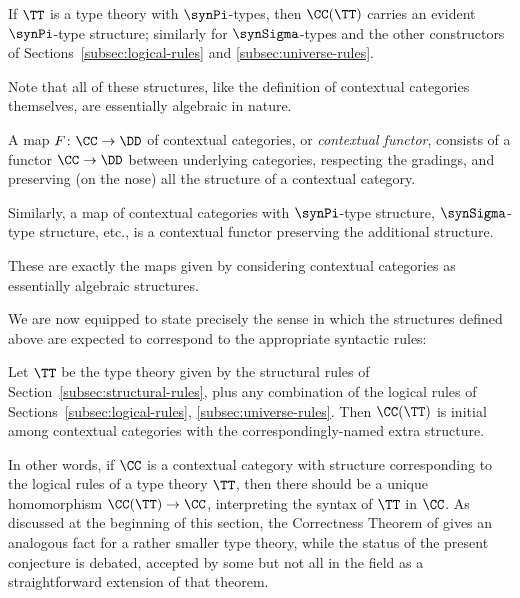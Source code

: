 \begin{example} If $\TT$ is a type theory with $\synPi$-types, then $\CC(\TT)$ carries an evident $\synPi$-type structure; similarly for $\synSigma$-types and the other constructors of Sections~\ref{subsec:logical-rules} and \ref{subsec:universe-rules}. \qedhere
\end{example}

\begin{remark}
Note that all of these structures, like the definition of contextual categories themselves, are essentially algebraic in nature.
\end{remark}

\begin{definition}
A map $F \colon \CC \to \DD$  of contextual categories, or \emph{contextual functor}, consists of a functor $\CC \to \DD$ between underlying categories, respecting the gradings, and preserving (on the nose) all the structure of a contextual category.

Similarly, a map of contextual categories with $\synPi$-type structure, $\synSigma$-type structure, etc., is a contextual functor preserving the additional structure.
\end{definition}

\begin{remark}
These are exactly the maps given by considering contextual categories as essentially algebraic structures.
\end{remark}

We are now equipped to state precisely the sense in which the structures defined above are expected to correspond to the appropriate syntactic rules:

\begin{conjecture} \label{conj:initiality} %
Let $\TT$ be the type theory given by the structural rules of Section~\ref{subsec:structural-rules}, plus any combination of the logical rules of Sections~\ref{subsec:logical-rules}, \ref{subsec:universe-rules}.  Then $\CC(\TT)$ is initial among contextual categories with the correspondingly-named extra structure.
\end{conjecture}

In other words, if $\CC$ is a contextual category with structure corresponding to the logical rules of a type theory $\TT$, then there should be a unique homomorphism $\CC(\TT) \to \CC$, interpreting the syntax of $\TT$ in $\CC$.  As discussed at the beginning of this section, the Correctness Theorem of \cite[Ch.~III, p.~181]{streicher:book} gives an analogous fact for a rather smaller type theory, while the status of the present conjecture is debated, accepted by some but not all in the field as a straightforward extension of that theorem.

